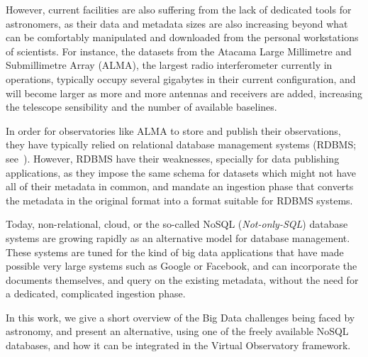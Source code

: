 However, current facilities are also suffering from the lack of dedicated tools for astronomers, as their data and metadata sizes are also increasing beyond what can be comfortably manipulated and downloaded from the personal workstations of scientists. For instance, the datasets from the Atacama Large Millimetre and Submillimetre Array (ALMA), the largest radio interferometer currently in operations, typically occupy several gigabytes in their current configuration, and will become larger as more and more antennas and receivers are %
added, increasing the telescope sensibility and the number of available baselines.

In order for observatories like ALMA to store and publish their observations, they have typically relied on relational database management systems (RDBMS; see~\cite{Silberschatz_01}). However, RDBMS have their weaknesses, specially for data publishing applications, as they impose the same schema for datasets which might not have all of their metadata in common, and mandate an ingestion phase that converts the metadata in the original format into a format suitable for RDBMS systems.

Today, non-relational, cloud, or the so-called NoSQL (\emph{Not-only-SQL}) database systems
are growing rapidly as an alternative model for database management. These systems are tuned for the kind of big data applications that have made possible very large systems such as Google or Facebook, and can incorporate the documents themselves, and query on the existing metadata, without the need for a dedicated, complicated ingestion phase.


In this work, we give a short overview of
the
Big Data 
challenges being faced by astronomy, %
and present an alternative, using one of the
freely available %
NoSQL databases, 
and how it can be integrated in the Virtual Observatory framework.